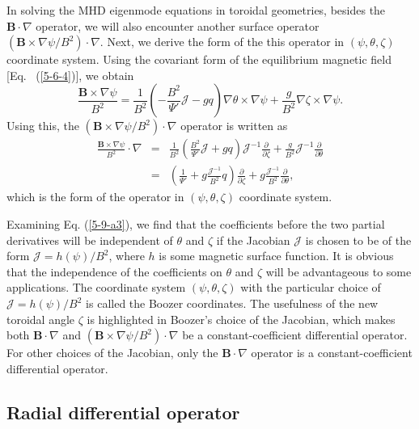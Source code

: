 \documentclass{llncs}
\begin{document}
In solving the MHD eigenmode equations in toroidal geometries, besides the
$\mathbf{B} \cdot \nabla$ operator, we will also encounter another surface
operator $(\mathbf{B} \times \nabla \psi / B^2) \cdot \nabla$. Next, we derive
the form of the this operator in $(\psi, \theta, \zeta)$ coordinate system.
Using the covariant form of the equilibrium magnetic field [Eq. \
(\ref{5-6-4})], we obtain
\begin{equation}
  \label{5-6-7} \frac{\mathbf{B} \times \nabla \psi}{B^2} = \frac{1}{B^2}
  \left( - \frac{B^2}{\Psi'} \mathcal{J}- g q \right) \nabla \theta \times
  \nabla \psi + \frac{g}{B^2} \nabla \zeta \times \nabla \psi .
\end{equation}
Using this, the $(\mathbf{B} \times \nabla \psi / B^2) \cdot \nabla$ operator
is written as
\begin{eqnarray}
  \frac{\mathbf{B} \times \nabla \psi}{B^2} \cdot \nabla & = & \frac{1}{B^2}
  \left( \frac{B^2}{\Psi'} \mathcal{J}+ g q \right) \mathcal{J}^{- 1}
  \frac{\partial}{\partial \zeta} + \frac{g}{B^2} \mathcal{J}^{- 1}
  \frac{\partial}{\partial \theta} \\
  & = & \left( \frac{1}{\Psi'} + g \frac{\mathcal{J}^{- 1}}{B^2} q \right)
  \frac{\partial}{\partial \zeta} + g \frac{\mathcal{J}^{- 1}}{B^2} 
  \frac{\partial}{\partial \theta},  \label{5-9-a3}
\end{eqnarray}
which is the form of the operator in $(\psi, \theta, \zeta)$ coordinate
system.

Examining Eq. (\ref{5-9-a3}), we find that the coefficients before the two
partial derivatives will be independent of $\theta$ and $\zeta$ if the
Jacobian $\mathcal{J}$ is chosen to be of the form $\mathcal{J}= h (\psi) /
B^2$, where $h$ is some magnetic surface function. It is obvious that the
independence of the coefficients on $\theta$ and $\zeta$ will be advantageous
to some applications. The coordinate system $(\psi, \theta, \zeta)$ with the
particular choice of $\mathcal{J}= h (\psi) / B^2$ is called the Boozer
coordinates. The usefulness of the new toroidal angle $\zeta$ is highlighted
in Boozer's choice of the Jacobian, which makes both $\mathbf{B} \cdot \nabla$
and $(\mathbf{B} \times \nabla \psi / B^2) \cdot \nabla$ be a
constant-coefficient differential operator. For other choices of the Jacobian,
only the $\mathbf{B} \cdot \nabla$ operator is a constant-coefficient
differential operator.

\subsection{Radial differential operator}
\end{document}
